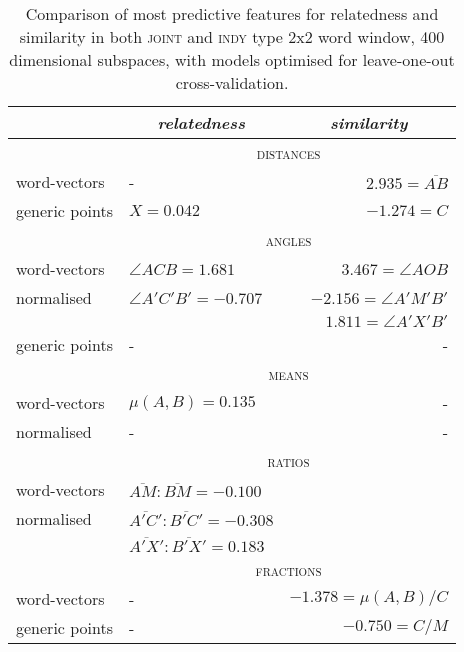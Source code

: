 \begin{table}
\centering
\begin{tabular}{llr}
\hline
& \multicolumn{1}{c}{\emph{relatedness}} & \multicolumn{1}{c}{\emph{similarity}} \\
\hline
& \multicolumn{2}{c}{\textsc{distances}} \\
word-vectors & - & $2.935 = \overline{AB}$ \\
generic points & $X = 0.042$ & $-1.274 = C$ \\
\hline
& \multicolumn{2}{c}{\textsc{angles}} \\
word-vectors & $\angle ACB = 1.681$ & $3.467 = \angle AOB$ \\
normalised & $\angle A'C'B' = -0.707$ & $-2.156 = \angle A'M'B'$ \\
& & $1.811 = \angle A'X'B'$ \\
generic points & - & - \\
\hline
& \multicolumn{2}{c}{\textsc{means}} \\
word-vectors & $\mu(A,B) = 0.135$ & - \\
normalised & - & - \\
\hline
& \multicolumn{2}{c}{\textsc{ratios}} \\
word-vectors & $\overline{AM}:\overline{BM} = -0.100$ \\
normalised & $\overline{A'C'}:\overline{B'C'} = -0.308$ \\
& $\overline{A'X'}:\overline{B'X'} = 0.183$ \\
\hline
& \multicolumn{2}{c}{\textsc{fractions}} \\
word-vectors & - & $-1.378 = \mu(A,B)/C$ \\
generic points & - & $-0.750 = C/M$ \\
\hline
\end{tabular}
\caption{Comparison of most predictive features for relatedness and similarity in both \textsc{joint} and \textsc{indy} type 2x2 word window, 400 dimensional subspaces, with models optimised for leave-one-out cross-validation.}
\label{tab:features}
\end{table}

